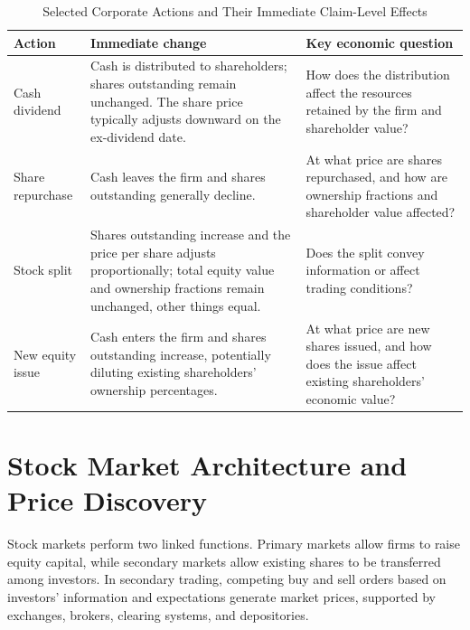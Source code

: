 \begin{table}[H]
\centering

\caption{Selected Corporate Actions and Their Immediate Claim-Level Effects}
\label{tab:ch9-corporate-actions}

\begin{tabularx}{\textwidth}{@{}p{2.8cm}Y Y@{}}

\toprule

\textbf{Action}
& \textbf{Immediate change}
& \textbf{Key economic question} \\

\midrule

Cash dividend
& Cash is distributed to shareholders; shares outstanding remain unchanged. The share price typically adjusts downward on the ex-dividend date.
& How does the distribution affect the resources retained by the firm and shareholder value? \\

Share repurchase
& Cash leaves the firm and shares outstanding generally decline.
& At what price are shares repurchased, and how are ownership fractions and shareholder value affected? \\

Stock split
& Shares outstanding increase and the price per share adjusts proportionally; total equity value and ownership fractions remain unchanged, other things equal.
& Does the split convey information or affect trading conditions? \\

New equity issue
& Cash enters the firm and shares outstanding increase, potentially diluting existing shareholders' ownership percentages.
& At what price are new shares issued, and how does the issue affect existing shareholders' economic value? \\

\bottomrule

\end{tabularx}

\end{table}

\section{Stock Market Architecture and Price Discovery}

Stock markets perform two linked functions. Primary markets allow firms to raise equity capital, while secondary markets allow existing shares to be transferred among investors. In secondary trading, competing buy and sell orders based on investors' information and expectations generate market prices, supported by exchanges, brokers, clearing systems, and depositories.

